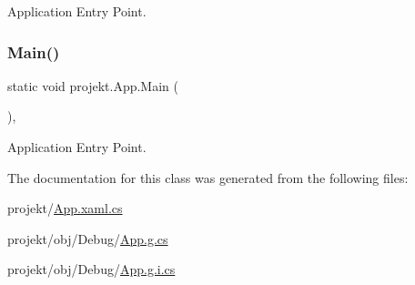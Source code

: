 Application Entry Point. 

\mbox{\label{classprojekt_1_1_app_aa099f0b6d877e4097ec4cbc0f99826ae}} 
\subsubsection{\texorpdfstring{Main()}{Main()}\hspace{0.1cm}{\footnotesize\ttfamily [9/9]}}
{\footnotesize\ttfamily static void projekt.\+App.\+Main (\begin{DoxyParamCaption}{ }\end{DoxyParamCaption})\hspace{0.3cm}{\ttfamily [inline]}, {\ttfamily [static]}}



Application Entry Point. 



The documentation for this class was generated from the following files\+:\begin{DoxyCompactItemize}
\item 
projekt/\mbox{\hyperlink{_app_8xaml_8cs}{App.\+xaml.\+cs}}\item 
projekt/obj/\+Debug/\mbox{\hyperlink{_debug_2_app_8g_8cs}{App.\+g.\+cs}}\item 
projekt/obj/\+Debug/\mbox{\hyperlink{_debug_2_app_8g_8i_8cs}{App.\+g.\+i.\+cs}}\end{DoxyCompactItemize}
